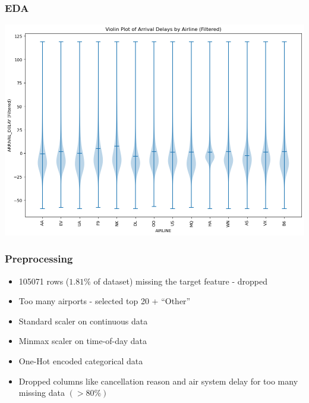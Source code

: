 \documentclass[
    aspectratio = 169,
    ]{beamer}
\begin{document}
\begin{frame}
    \frametitle{EDA}
    \begin{center}
        \includegraphics[width=0.7\linewidth]{visualizations/arrivaldelaybyairlinefiltered.png}
    \end{center}
\end{frame}

\begin{frame}
    \frametitle{Preprocessing}
    \begin{itemize}
        \item 105071 rows (\(1.81\%\) of dataset) missing the target feature - dropped
        \item Too many airports - selected top 20 + ``Other''
        \item Standard scaler on continuous data
        \item Minmax scaler on time-of-day data
        \item One-Hot encoded categorical data
        \item Dropped columns like cancellation reason and air system delay for too many missing data \((>80\%)\)
    \end{itemize}
\end{frame}
\end{document}
